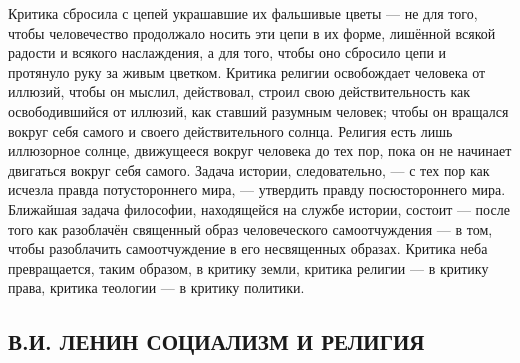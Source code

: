 \documentclass[12pt]{article}
\newcommand{\parnum}{(\arabic{parcount})}
\newcounter{parcount}
\newenvironment{parnumbers}{%
  \par%
  \everypar{\noindent \stepcounter{parcount}\marginpar[]{\parnum}}%
}{}
\begin{document}
\begin{parnumbers}
Критика сбросила с цепей украшавшие их фальшивые цветы — не для того, чтобы человечество продолжало носить эти цепи в их форме, лишённой всякой радости и всякого наслаждения, а для того, чтобы оно сбросило цепи и протянуло руку за живым цветком. Критика религии освобождает человека от иллюзий, чтобы он мыслил, действовал, строил свою действительность как освободившийся от иллюзий, как ставший разумным человек; чтобы он вращался вокруг себя самого и своего действительного солнца. Религия есть лишь иллюзорное солнце, движущееся вокруг человека до тех пор, пока он не начинает двигаться вокруг себя самого. Задача истории, следовательно, — с тех пор как исчезла правда потустороннего мира, — утвердить правду посюстороннего мира. Ближайшая задача философии, находящейся на службе истории, состоит — после того как разоблачён священный образ человеческого самоотчуждения — в том, чтобы разоблачить самоотчуждение в его несвященных образах. Критика неба превращается, таким образом, в критику земли, критика религии — в критику права, критика теологии — в критику политики.
\end{parnumbers}

\subsection{В.И. ЛЕНИН СОЦИАЛИЗМ И РЕЛИГИЯ}
\end{document}
